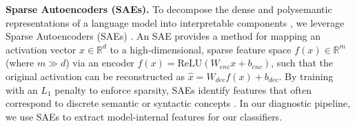

\textbf{Sparse Autoencoders (SAEs).} To decompose the dense and polysemantic representations of a language model into interpretable components \citep{elhage2022toy}, we leverage Sparse Autoencoders (SAEs) \citep{bricken2023towards, cunningham2023sparse}. An SAE provides a method for mapping an activation vector $x \in \mathbb{R}^d$ to a high-dimensional, sparse feature space $f(x) \in \mathbb{R}^m$ (where $m \gg d$) via an encoder $f(x) = \text{ReLU}(W_{enc}x + b_{enc})$, such that the original activation can be reconstructed as $\hat{x} = W_{dec}f(x) + b_{dec}$. By training with an $L_1$ penalty to enforce sparsity, SAEs identify features that often correspond to discrete semantic or syntactic concepts \citep{huang2024ravel}. In our diagnostic pipeline, we use SAEs to extract model-internal features for our classifiers. 



